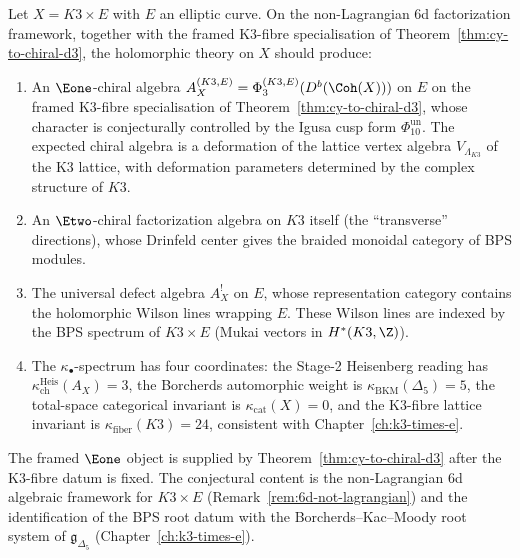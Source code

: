 \begin{conjecture}
\label{conj:6d-k3xe}
\ClaimStatusConjectured
Let $X = K3 \times E$ with $E$ an elliptic curve. On the non-Lagrangian 6d factorization framework, together with the framed K3-fibre specialisation of Theorem~\ref{thm:cy-to-chiral-d3}, the holomorphic theory on $X$ should produce:
\begin{enumerate}[label=\textup{(\roman*)}]
 \item An $\Eone$-chiral algebra $A_{X}^{(K3,E)} = \Phi_3^{(K3,E)}(D^b(\Coh(X)))$ on $E$ on the framed K3-fibre specialisation of Theorem~\ref{thm:cy-to-chiral-d3}, whose character is conjecturally controlled by the Igusa cusp form $\Phi_{10}^{\mathrm{un}}$. The expected chiral algebra is a deformation of the lattice vertex algebra $V_{\Lambda_{K3}}$ of the K3 lattice, with deformation parameters determined by the complex structure of $K3$.
 \item An $\Etwo$-chiral factorization algebra on $K3$ itself (the ``transverse'' directions), whose Drinfeld center gives the braided monoidal category of BPS modules.
 \item The universal defect algebra $A^!_X$ on $E$, whose representation category contains the holomorphic Wilson lines wrapping $E$. These Wilson lines are indexed by the BPS spectrum of $K3 \times E$ (Mukai vectors in $H^*(K3, \Z)$).
 \item The \(\kappa_\bullet\)-spectrum has four coordinates: the Stage-2 Heisenberg reading has $\kappa_{\mathrm{ch}}^{\mathrm{Heis}}(A_X) = 3$, the Borcherds automorphic weight is $\kappa_{\mathrm{BKM}}(\Delta_5) = 5$, the total-space categorical invariant is $\kappa_{\mathrm{cat}}(X) = 0$, and the K3-fibre lattice invariant is $\kappa_{\mathrm{fiber}}(K3) = 24$, consistent with Chapter~\ref{ch:k3-times-e}.
\end{enumerate}
The framed $\Eone$ object is supplied by Theorem~\ref{thm:cy-to-chiral-d3} after the K3-fibre datum is fixed. The conjectural content is the non-Lagrangian 6d algebraic framework for $K3\times E$ (Remark~\ref{rem:6d-not-lagrangian}) and the identification of the BPS root datum with the Borcherds--Kac--Moody root system of $\mathfrak{g}_{\Delta_5}$ (Chapter~\ref{ch:k3-times-e}).
\end{conjecture}

